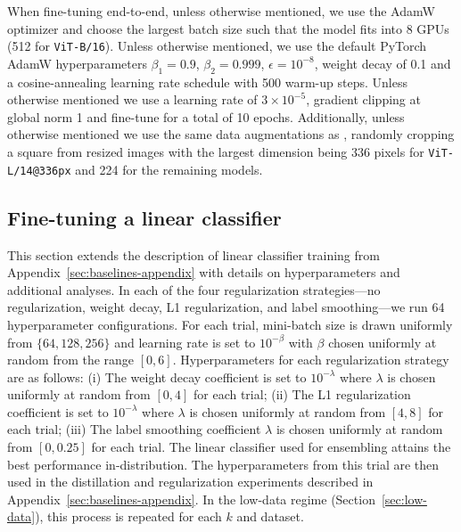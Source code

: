 When fine-tuning end-to-end, unless otherwise mentioned, we use the AdamW optimizer \cite{loshchilov2018decoupled, paszke2019pytorch} and choose the largest batch size such that the model fits into 8 GPUs (512 for \texttt{ViT-B/16}). Unless otherwise mentioned, we use the default PyTorch AdamW hyperparameters $\beta_1=0.9$, $\beta_2=0.999$, $\epsilon=10^{-8}$, weight decay of 0.1 and a cosine-annealing learning rate schedule \cite{loshchilov2016sgdr} with 500 warm-up steps. Unless otherwise mentioned we use a learning rate of $3\times10^{-5}$, gradient clipping at global norm 1 and fine-tune for a total of 10 epochs. Additionally, unless otherwise mentioned we use the same data augmentations as \cite{radford2021learning}, randomly cropping a square from resized images with the largest dimension being 336 pixels for \texttt{ViT-L/14@336px} and 224 for the remaining models.

\subsection{Fine-tuning a linear classifier}\label{sec:moreclf}

This section extends the description of linear classifier training from Appendix~\ref{sec:baselines-appendix} with details on hyperparameters and additional analyses. In each of the four regularization strategies---no regularization, weight decay, L1 regularization, and label smoothing---we run 64 hyperparameter configurations. For each trial, mini-batch size is drawn uniformly from $\{64, 128, 256\}$ and learning rate is set to $10^{-\beta}$ with $\beta$ chosen uniformly at random from the range $[0,6]$.
Hyperparameters for each regularization strategy are as follows: (i) The weight decay coefficient is set to $10^{-\lambda}$ where $\lambda$ is chosen uniformly at random from $[0,4]$ for each trial; (ii) The L1 regularization coefficient is set to $10^{-\lambda}$ where $\lambda$ is chosen uniformly at random from $[4,8]$ for each trial; (iii) The label smoothing \cite{muller2019does} coefficient $\lambda$ is chosen uniformly at random from $[0, 0.25]$ for each trial. The linear classifier used for ensembling attains the best performance in-distribution. The hyperparameters from this trial are then used in the distillation and regularization experiments described in Appendix~\ref{sec:baselines-appendix}. In the low-data regime (Section~\ref{sec:low-data}), this process is repeated for each $k$ and dataset.





